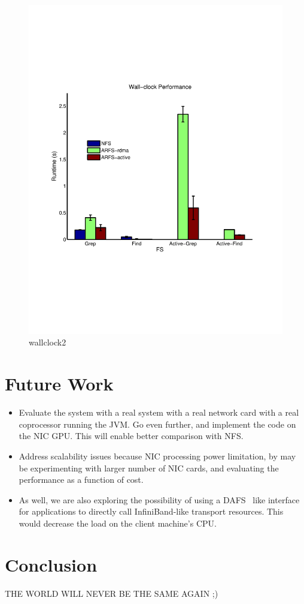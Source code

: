 \documentclass[10pt]{article}
\begin{document}
\begin{figure}
  \centering
\includegraphics[scale=0.5, trim = 0 200 0 200]{../../results/matlab/wallclock2.pdf}
  \caption{wallclock2}\label{wallclock2}
\end{figure}

\section{Future Work}
\begin{itemize}
\item Evaluate the system with a real system with a real network card with
a real coprocessor running the JVM. Go even further, and implement the code
on the NIC GPU. This will enable better comparison with NFS.
\item Address scalability issues because NIC processing power limitation, by may
be experimenting with larger number of NIC cards, and evaluating the performance
as a function of cost.
\item As well, we are also exploring the possibility of using a DAFS~\cite{DAFS}
like interface for applications to directly call InfiniBand-like transport resources.
This would decrease the load on the client machine's CPU.
\end{itemize}

\section{Conclusion}
THE WORLD WILL NEVER BE THE SAME AGAIN ;)


 
\end{document}
